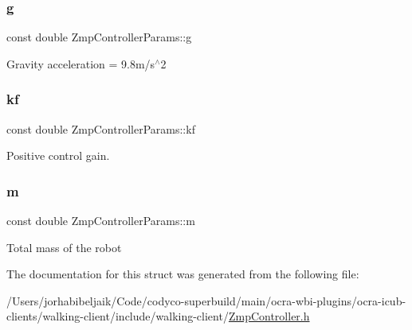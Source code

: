 \subsubsection{\texorpdfstring{g}{g}}
{\footnotesize\ttfamily const double Zmp\+Controller\+Params\+::g}

Gravity acceleration = 9.\+8m/s$^\wedge$2 \hypertarget{structZmpControllerParams_a6138cbf819799519abd3864bd8bf05cf}{}\label{structZmpControllerParams_a6138cbf819799519abd3864bd8bf05cf} 
\subsubsection{\texorpdfstring{kf}{kf}}
{\footnotesize\ttfamily const double Zmp\+Controller\+Params\+::kf}

Positive control gain. \hypertarget{structZmpControllerParams_a1a3eea24e276953f2e74c4066b24106c}{}\label{structZmpControllerParams_a1a3eea24e276953f2e74c4066b24106c} 
\subsubsection{\texorpdfstring{m}{m}}
{\footnotesize\ttfamily const double Zmp\+Controller\+Params\+::m}

Total mass of the robot 

The documentation for this struct was generated from the following file\+:\begin{DoxyCompactItemize}
\item 
/\+Users/jorhabibeljaik/\+Code/codyco-\/superbuild/main/ocra-\/wbi-\/plugins/ocra-\/icub-\/clients/walking-\/client/include/walking-\/client/\hyperlink{ZmpController_8h}{Zmp\+Controller.\+h}\end{DoxyCompactItemize}
